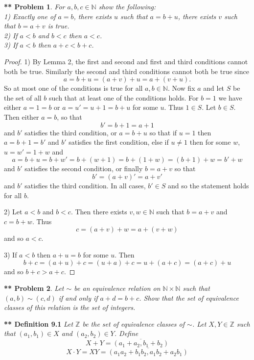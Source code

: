 \documentclass{article}
\newtheorem{**}{** Problem}
\begin{document}
\begin{flushleft}
\begin{**}
For $a,b,c \in \mathbb{N}$ show the following:\\
1) Exactly one of $a=b$, there exists $u$ such that $a=b+u$, there exists $v$ such that $b=a+v$ is true.\\
2) If $a<b$ and $b<c$ then $a<c$.\\
3) If $a<b$ then $a+c<b+c$.\\
\end{**}
\begin{proof}
1) By Lemma 2, the first and second and first and third conditions cannot both be true. Similarly the second and third conditions cannot both be true since
\[
a = b+u = (a+v) + u = a + (v + u).
\]
So at most one of the conditions is true for all $a,b \in \mathbb{N}$. Now fix $a$ and let $S$ be the set of all $b$ such that at least one of the conditions holds. For $b = 1$ we have either $a = 1 = b$ or $a = u' = u + 1 = b + u$ for some $u$. Thus $1 \in S$. Let $b \in S$. Then either $a = b$, so that
\[
b' = b + 1 = a + 1
\]
and $b'$ satisfies the third condition, or $a = b + u$ so that if $u = 1$ then $a = b + 1 = b'$ and $b'$ satisfies the first condition, else if $u \neq 1$ then for some $w$, $u = w' = 1 + w$ and
\[
a = b + u = b + w' = b + (w + 1) = b + (1 + w) = (b+1) + w = b' + w
\]
and $b'$ satisfies the second condition, or finally $b = a + v$ so that
\[
b' = (a + v)' = a + v'
\]
and $b'$ satisfies the third condition. In all cases, $b' \in S$ and so the statement holds for all $b$.\newline

2) Let $a < b$ and $b < c$. Then there exists $v,w \in \mathbb{N}$ such that $b = a + v$ and $c = b + w$. Thus
\[
c = (a + v) + w = a + (v + w)
\]
and so $a < c$.\newline

3) If $a < b$ then $a + u = b$ for some $u$. Then
\[
b + c = (a + u) + c = (u + a) + c = u + (a + c) = (a + c) + u
\]
and so $b + c > a + c$.
\end{proof}

\begin{**}
Let $\sim$ be an equivalence relation on $\mathbb{N} \times \mathbb{N}$ such that $(a,b) \sim (c,d)$ if and only if $a+d = b+c$. Show that the set of equivalence classes of this relation is the set of integers.
\end{**}
\textbf{** Definition 9.1}
\textit{Let $\mathbb{Z}$ be the set of equivalence classes of $\sim$. Let $X,Y \in \mathbb{Z}$ such that $(a_1, b_1) \in X$ and $(a_2, b_2) \in Y$. Define
\[
X + Y = \overline{(a_1 + a_2, b_1 + b_2)}
\]
\[
X \cdot Y = XY = \overline{(a_1a_2 + b_1b_2, a_1b_2 + a_2b_1)}
\]}


\end{flushleft}
\end{document}
